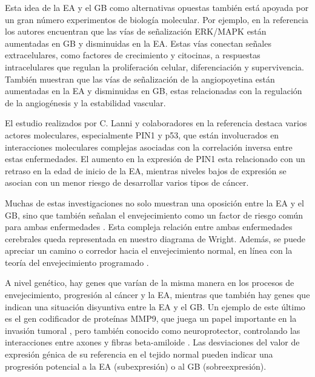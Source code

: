 Esta idea de la EA y el GB como alternativas opuestas también está apoyada por un gran número experimentos de biología molecular. Por ejemplo, en la referencia \cite{Liu_2013} los autores encuentran que las vías de señalización ERK/MAPK están aumentadas en GB y disminuidas en la EA. Estas vías conectan señales extracelulares, como factores de crecimiento y citocinas, a respuestas intracelulares que regulan la proliferación celular, diferenciación y supervivencia. También muestran que las vías de señalización de la angiopoyetina están aumentadas en la EA y disminuidas en GB, estas relacionadas con la regulación de la angiogénesis y la estabilidad vascular.

El estudio realizados por C. Lanni y colaboradores en la referencia \cite{Lanni_2020} destaca varios actores moleculares, especialmente PIN1 y p53, que están involucrados en interacciones moleculares complejas asociadas con la correlación inversa entre estas enfermedades. El aumento en la expresión de PIN1 esta relacionado con un retraso en la edad de inicio de la EA, mientras niveles bajos de expresión se asocian con un menor riesgo de desarrollar varios tipos de cáncer.

Muchas de estas investigaciones no solo muestran una oposición entre la EA y el GB, sino que también señalan el envejecimiento como un factor de riesgo común para ambas enfermedades \cite{Driver_2012, Musicco_2013 , Liu_2013, Lanni_2020, A_Driver_2010}. Esta compleja relación entre ambas enfermedades cerebrales queda representada en nuestro diagrama de Wright. Además, se puede apreciar un camino o corredor hacia el envejecimiento normal, en línea con la teoría del envejecimiento programado \cite{Magalh_es_2012, 	Gems_2022}.

A nivel genético, hay genes que varían de la misma manera en los procesos de envejecimiento, progresión al cáncer y la EA, mientras que también hay genes que indican una situación disyuntiva entre la EA y el GB. Un ejemplo de este último es el gen codificador de proteínas MMP9, que juega un papel importante en la invasión tumoral \cite{Choe2002, Xue_2017}, pero también conocido como neuroprotector, controlando las interacciones entre axones y fibras beta-amiloide \cite{Kaminari_2017}. Las desviaciones del valor de expresión génica de su referencia en el tejido normal pueden indicar una progresión potencial a la EA (subexpresión) o al GB (sobreexpresión).

